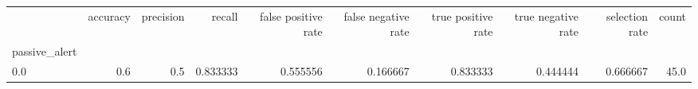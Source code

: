 \begin{tabular}{lrrrrrrrrr}
\toprule
{} &  accuracy &  precision &    recall &  false positive rate &  false negative rate &  true positive rate &  true negative rate &  selection rate &  count \\
passive\_alert &           &            &           &                      &                      &                     &                     &                 &        \\
\midrule
0.0           &       0.6 &        0.5 &  0.833333 &             0.555556 &             0.166667 &            0.833333 &            0.444444 &        0.666667 &   45.0 \\
\bottomrule
\end{tabular}
